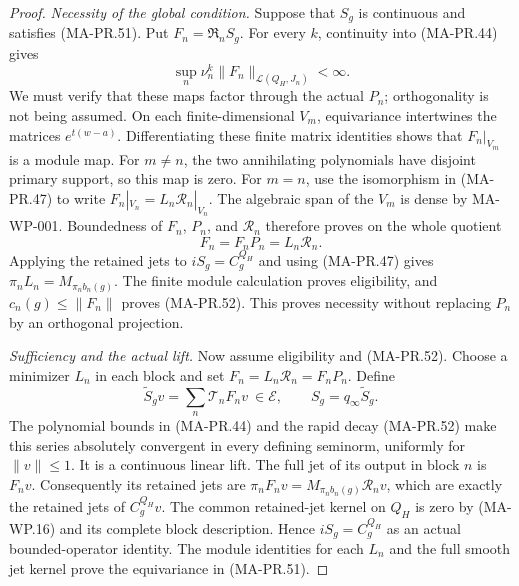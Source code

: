 \begin{proof}
\emph{Necessity of the global condition.}
Suppose that \(S_g\) is continuous and satisfies
(MA-PR.51).  Put \(F_n=\mathfrak R_nS_g\).
For every \(k\), continuity into (MA-PR.44) gives
\[
             \sup_n\nu_n^k\|F_n\|_{\mathcal L(Q_H,J_n)}
                           <\infty .
 \tag{MA-PR.56}
\]
We must verify that these maps factor through the
actual \(P_n\); orthogonality is not being assumed.
On each finite-dimensional \(V_m\), equivariance
intertwines the matrices \(e^{t(w-a)}\).
Differentiating these finite matrix identities shows
that \(F_n|_{V_m}\) is a module map.
For \(m\ne n\), the two annihilating polynomials have
disjoint primary support, so this map is zero.
For \(m=n\), use the isomorphism in (MA-PR.47)
to write \(F_n|_{V_n}=L_n\mathscr R_n|_{V_n}\).
The algebraic span of the \(V_m\) is dense by
MA-WP-001.  Boundedness of \(F_n\), \(P_n\), and
\(\mathscr R_n\) therefore proves on the whole quotient
\[
                  F_n=F_nP_n=L_n\mathscr R_n .
 \tag{MA-PR.57}
\]
Applying the retained jets to \(iS_g=C_g^{Q_H}\)
and using (MA-PR.47) gives
\(\pi_nL_n=M_{\pi_nb_n(g)}\).
The finite module calculation proves eligibility,
and \(c_n(g)\le\|F_n\|\) proves (MA-PR.52).
This proves necessity without replacing \(P_n\)
by an orthogonal projection.

\emph{Sufficiency and the actual lift.}
Now assume eligibility and (MA-PR.52).
Choose a minimizer \(L_n\) in each block and set
\(F_n=L_n\mathscr R_n=F_nP_n\).
Define
\[
       \widetilde S_gv=\sum_n\mathcal T_nF_nv
              \ \in\mathcal E,\qquad
       S_g=q_\infty\widetilde S_g .
 \tag{MA-PR.58}
\]
The polynomial bounds in (MA-PR.44) and the rapid
decay (MA-PR.52) make this series absolutely convergent
in every defining seminorm, uniformly for \(\|v\|\le1\).
It is a continuous linear lift.
The full jet of its output in block \(n\) is \(F_nv\).
Consequently its retained jets are
\(\pi_nF_nv=M_{\pi_nb_n(g)}\mathscr R_nv\),
which are exactly the retained jets of \(C_g^{Q_H}v\).
The common retained-jet kernel on \(Q_H\) is zero
by (MA-WP.16) and its complete block description.
Hence \(iS_g=C_g^{Q_H}\) as an actual bounded-operator
identity.  The module identities for each \(L_n\)
and the full smooth jet kernel prove the equivariance
in (MA-PR.51).


\end{proof}
